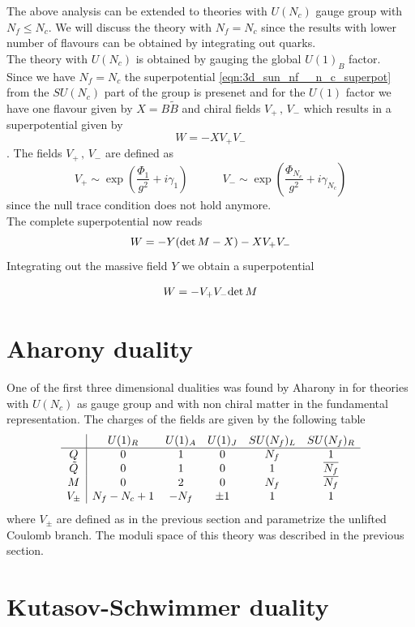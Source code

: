 The above analysis can be extended to theories with $U(N_c)$ gauge group with $N_f \leq N_c$.
We will discuss the theory with $N_f = N_c$ since the results with lower number of flavours can be obtained by integrating out quarks.\\
The theory with $U(N_c)$ is obtained by gauging the global $U(1)_B$ factor.\\
Since we have $N_f=N_c$ the superpotential \eqref{eqn:3d_sun_nf__n_c_superpot} from the $SU(N_c)$ part of the group is presenet  and for the $U(1)$ factor we have one flavour given by $X = B \tilde{B}$ 
and chiral fields $V_+ \, , \,V_-$ which results in a superpotential given by
 $$ W = - X V_+ V_-$$.
The fields $V_+ \, , \, V_-$ are defined as 
\begin{equation}
V_+ \sim \exp{ \left(  \frac{\Phi_1}{g^2} + i \gamma_1 \right) } \qquad \quad V_- \sim \exp{ \left( \frac{\Phi_{N_c}}{g^2} + i \gamma_{N_c} \right) }
\end{equation}
since the null trace condition does not hold anymore.\\
The complete superpotential now reads
\begin{equation}
 W = - Y ( \mathrm{det } \,{M}  - X) - X V_+ V_- 
 \end{equation} 
Integrating out the massive field $Y$  we obtain a superpotential

\begin{equation}
W = -  V_+ V_-  \mathrm{det } \,{M}
\end{equation}



\section{Aharony duality}
One of the first three dimensional dualities was found by Aharony in \cite{Aharony:1997gp} for theories with $U(N_c) $ as gauge group and with non chiral matter in the fundamental representation.
The charges of the fields are given by the following table
\begin{equation}
\begin{array}{ c | c c c c c}
  & U(1)_R & U(1)_A & U(1)_J  & SU(N_f)_L & SU(N_f)_R \\
 \hline
 Q & 0 & 1 & 0 & N_f & 1 \\  
 \tilde{Q}& 0  & 1 & 0  & 1 & \overline{N_f}  \\  
   M & 0  & 2 & 0& N_f  & \overline{N_f}\\  
  V_{\pm} & N_f - N_c + 1 & - N_f  & \pm 1 &  1 & 1 \\
\end{array}
\end{equation}
where $V_{\pm} $ are defined as in the previous section and parametrize the unlifted Coulomb branch.
The moduli space of this theory was described in the previous section.









\section{Kutasov-Schwimmer duality}
